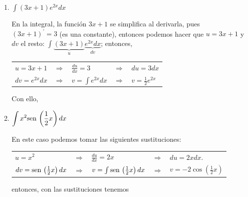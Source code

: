 \begin{enumerate}[leftmargin=1.2em,   itemindent=0pt,       labelwidth=\labelwidth,labelsep=0.5em,]
	
\item $\displaystyle{\int (3x+1) e^{2x}dx}$

En la integral, la función $3x+1$ se simplifica al derivarla, pues $(3x+1)^\prime=3$ (es una constante), entonces podemos hacer que $u=3x+1$ y $dv$ el resto: $\displaystyle{\int \underbrace{(3x+1)}_u \underbrace{e^{2x}dx}_{dv}}$; entonces,


\begin{center}
\begin{tabular}{lllll}
$u=3x+1$ & $\Rightarrow$ & $\frac{du}{dx} =3$ & $\Rightarrow$ & $du=3dx$\\
$dv=e^{2x}dx$ & $\Rightarrow$ & $v =\int e^{2x}dx$ & $\Rightarrow$ & $v=\frac{1}{2}e^{2x}$
\end{tabular}
\end{center}
Con ello,




\item $\displaystyle{\int x^{2}\text{\rm sen}\,\left(\frac{1}{2}x\right)dx}$

En este caso podemos tomar las siguientes sustituciones:
\begin{center}
\begin{tabular}{lllll}
$u=x^{2}$ & $\Rightarrow$ & $\frac{du}{dx} =2x$ & $\Rightarrow$ & $du=2x dx$.\\
$dv=\text{\rm sen}\, \left(\frac{1}{2}x\right)dx$ & $\Rightarrow$ & $v =\int \text{\rm sen}\, \left(\frac{1}{2}x\right)dx$ & $\Rightarrow$ & $v=-2\cos\left(\frac{1}{2}x\right)$
\end{tabular}
\end{center}

entonces, con las sustituciones tenemos





\end{enumerate}
